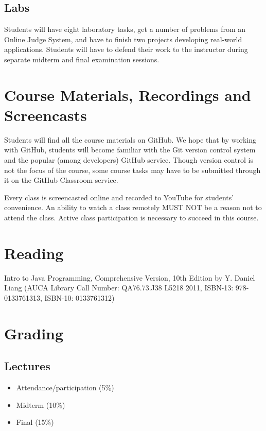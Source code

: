 \documentclass[12pt,a4paper,oneside]{article}
\begin{document}
        \subsection{Labs}

            Students will have eight laboratory tasks, get a number of problems from an Online Judge System, and have to finish two projects developing real-world applications. Students will have to defend their work to the instructor during separate midterm and final examination sessions.

    \section{Course Materials, Recordings and Screencasts}
        
        Students will find all the course materials on GitHub. We hope that by working with GitHub, students will become familiar with the Git version control system and the popular (among developers) GitHub service. Though version control is not the focus of the course, some course tasks may have to be submitted through it on the GitHub Classroom service.

    	Every class is screencasted online and recorded to YouTube for students’ convenience. An ability to watch a class remotely MUST NOT be a reason not to attend the class. Active class participation is necessary to succeed in this course.

    \section{Reading}

        Intro to Java Programming, Comprehensive Version, 10th Edition by Y.
        Daniel Liang (AUCA Library Call Number: QA76.73.J38 L5218 2011, ISBN-13:
        978-0133761313, ISBN-10: 0133761312)

    \section{Grading}

        \subsection{Lectures}

            \begin{itemize}
                \item Attendance/participation (5\%)
                \item Midterm (10\%)
                \item Final (15\%)
            \end{itemize}
\end{document}

